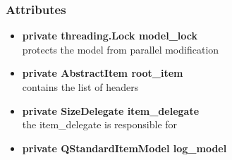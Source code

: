 \subsubsection{Attributes}
\begin{itemize}
  \item \textbf{private threading.Lock model\_lock}\\ 
  protects the model from parallel modification
  \item \textbf{private AbstractItem root\_item}\\
  contains the list of headers
  \item \textbf{private SizeDelegate item\_delegate}\\
  the item\_delegate is responsible for 
  \item \textbf{private QStandardItemModel log\_model}\\
   
\end{itemize}
